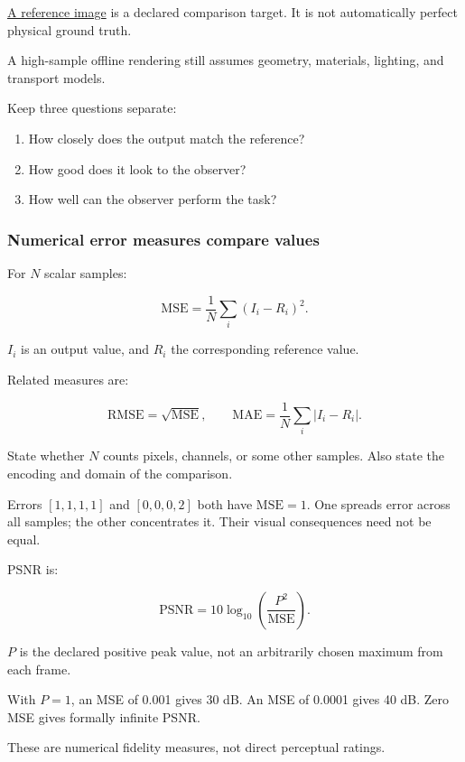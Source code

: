 \hyperref[appendix-b2c1846508bf]{A reference image} is a declared comparison target. It is not automatically perfect physical ground truth.

A high-sample offline rendering still assumes geometry, materials, lighting, and transport models.

Keep three questions separate:

\begin{enumerate}
\def\labelenumi{\arabic{enumi}.}
\tightlist
\item
  How closely does the output match the reference?
\item
  How good does it look to the observer?
\item
  How well can the observer perform the task?
\end{enumerate}

\subsubsection{Numerical error measures compare values}\label{04-visual-computing-ii-ch043-numerical-error-measures-compare-values}

For \(N\) scalar samples:

\[
\mathrm{MSE}=\frac1N\sum_i(I_i-R_i)^2.
\]

\(I_i\) is an output value, and \(R_i\) the corresponding reference value.

Related measures are:

\[
\mathrm{RMSE}=\sqrt{\mathrm{MSE}},
\qquad
\mathrm{MAE}=\frac1N\sum_i|I_i-R_i|.
\]

State whether \(N\) counts pixels, channels, or some other samples. Also state the encoding and domain of the comparison.

Errors \([1,1,1,1]\) and \([0,0,0,2]\) both have \(\mathrm{MSE}=1\). One spreads error across all samples; the other concentrates it. Their visual consequences need not be equal.

PSNR is:

\[
\mathrm{PSNR}
=10\log_{10}\left(\frac{P^2}{\mathrm{MSE}}\right).
\]

\(P\) is the declared positive peak value, not an arbitrarily chosen maximum from each frame.

With \(P=1\), an MSE of 0.001 gives 30 dB. An MSE of 0.0001 gives 40 dB. Zero MSE gives formally infinite PSNR.

These are numerical fidelity measures, not direct perceptual ratings.

